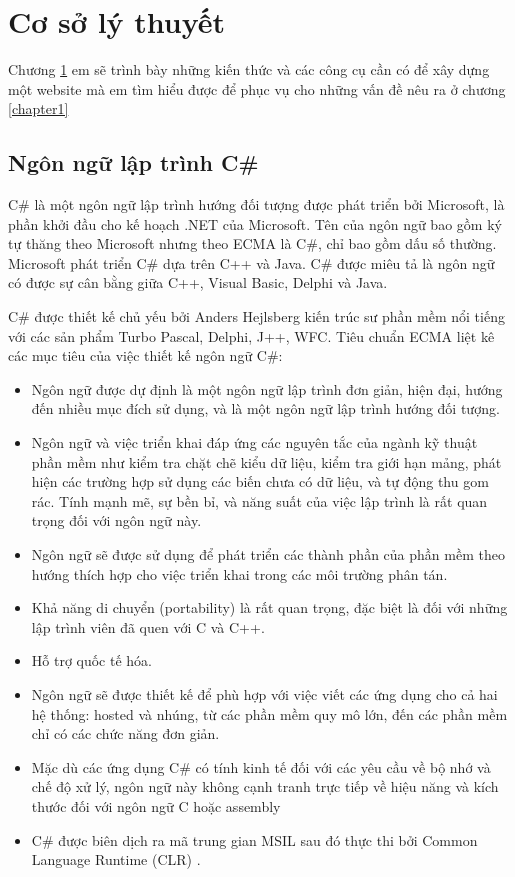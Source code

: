 \chapter{Cơ sở lý thuyết}
\label{chapter2}
Chương \ref{chapter2} em sẽ trình bày những kiến thức và các công cụ cần có để xây dựng một website mà em tìm hiểu được để phục vụ cho những vấn đề nêu ra ở chương \ref{chapter1}
\section{Ngôn ngữ lập trình C\# } \label{ngonngu} 
C\# là một ngôn ngữ lập trình hướng đối tượng được phát triển bởi Microsoft, là phần khởi đầu cho kế hoạch .NET của Microsoft. Tên của ngôn ngữ bao gồm ký tự thăng theo Microsoft nhưng theo ECMA là C\#, chỉ bao gồm dấu số thường. Microsoft phát triển C\# dựa trên C++ và Java. C\# được miêu tả là ngôn ngữ có được sự cân bằng giữa C++, Visual Basic, Delphi và Java.
\par
C\# được thiết kế chủ yếu bởi Anders Hejlsberg kiến trúc sư phần mềm nổi tiếng với các sản phẩm Turbo Pascal, Delphi, J++, WFC.
Tiêu chuẩn ECMA liệt kê các mục tiêu của việc thiết kế ngôn ngữ C\#:
\begin{itemize}
\item Ngôn ngữ được dự định là một ngôn ngữ lập trình đơn giản, hiện đại, hướng đến nhiều mục đích sử dụng, và là một ngôn ngữ lập trình hướng đối tượng.
\item Ngôn ngữ và việc triển khai đáp ứng các nguyên tắc của ngành kỹ thuật phần mềm như kiểm tra chặt chẽ kiểu dữ liệu, kiểm tra giới hạn mảng, phát hiện các trường hợp sử dụng các biến chưa có dữ liệu, và tự động thu gom rác. Tính mạnh mẽ, sự bền bỉ, và năng suất của việc lập trình là rất quan trọng đối với ngôn ngữ này.
\item Ngôn ngữ sẽ được sử dụng để phát triển các thành phần của phần mềm theo hướng thích hợp cho việc triển khai trong các môi trường phân tán.
\item Khả năng di chuyển (portability) là rất quan trọng, đặc biệt là đối với những lập trình viên đã quen với C và C++.
\item Hỗ trợ quốc tế hóa.
\item Ngôn ngữ sẽ được thiết kế để phù hợp với việc viết các ứng dụng cho cả hai hệ thống: hosted và nhúng, từ các phần mềm quy mô lớn, đến các phần mềm chỉ có các chức năng đơn giản.
\item Mặc dù các ứng dụng C\# có tính kinh tế đối với các yêu cầu về bộ nhớ và chế độ xử lý, ngôn ngữ này không cạnh tranh trực tiếp về hiệu năng và kích thước đối với ngôn ngữ C hoặc assembly
\item C\# được biên dịch ra mã trung gian MSIL sau đó thực thi bởi Common Language Runtime (CLR) \cite{2}.
\end{itemize}
